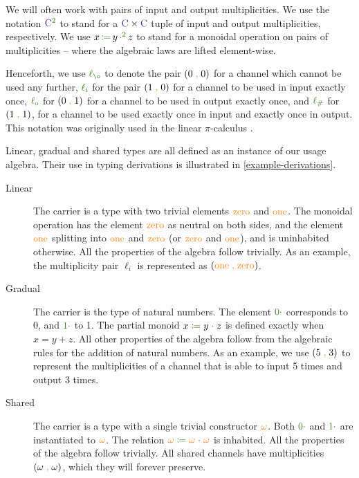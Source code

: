 \documentclass[a4paper,UKenglish,cleveref,autoref,thm-restate,authorcolumns]{lipics-v2019}
\theoremstyle{definition}
\newcommand{\picalc}{$\pi$-calculus}
\newcommand{\type}[1]{\textcolor{BlueViolet}{\operatorname{#1}}}
\newcommand{\constr}[1]{\textcolor{BurntOrange}{\operatorname{#1}}}
\newcommand{\func}[1]{\textcolor{OliveGreen}{\operatorname{#1}}}
\newcommand{\comma}{\; \constr{,} \;}
\newcommand{\op}[3]{#1 \; \func{\coloneqq} \; #2 \; \func{\cdot} \; #3}
\newcommand{\opsquared}[3]{#1 \, \func{\coloneqq} \, #2 \, \func{\cdot^2} \, #3}
\newcommand{\zero}{\func{0\cdot}}
\newcommand{\one}{\func{1\cdot}}
\newcommand{\li}{\func{\ell_i}}
\newcommand{\lo}{\func{\ell_o}}
\newcommand{\lz}{\func{\ell_{\o}}}
\newcommand{\lio}{\func{\ell_{\#}}}
\begin{document}
\begin{note}
  \label{note:linearity}
  We will often work with pairs of input and output multiplicities.
  We use the notation $\type{C}^{\func{2}}$ to stand for a $\type{C} \times \type{C}$ tuple of input and output multiplicities, respectively.
  We use $\opsquared{x}{y}{z}$ to stand for a monoidal operation on pairs of multiplicities -- where the algebraic laws are lifted element-wise.

  Henceforth, we use $\lz$ to denote the pair $(0 \comma 0)$ for a channel which cannot be used any further, $\li$ for the pair $(1 \comma 0)$ for a channel to be used in input exactly once, $\lo$ for $(0 \comma 1)$ for a channel to be used in output exactly once, and $\lio$ for $(1 \comma 1)$, for a channel to be used exactly once in input and exactly once in output.
  This notation was originally used in the linear \picalc{} \cite{KPT96,Sangio01}.
\end{note}

Linear, gradual and shared types are all defined as an instance of our usage algebra.
Their use in typing derivations is illustrated in \autoref{example-derivations}.
\begin{description}
  \item [Linear]
    The carrier is a type with two trivial elements $\constr{zero}$ and $\constr{one}$.
    The monoidal operation has the element $\constr{zero}$ as neutral on both sides, and the element $\constr{one}$ splitting into $\constr{one}$ and $\constr{zero}$ (or $\constr{zero}$ and $\constr{one}$), and is uninhabited otherwise.
    All the properties of the algebra follow trivially.
    As an example, the multiplicity pair $\ell_i$ is represented as $(\constr{one} \comma \constr{zero})$.

    \item [Gradual]
    The carrier is the type of natural numbers.
    The element $\zero$ corresponds to 0, and $\one$ to 1.
    The partial monoid $\op{x}{y}{z}$ is defined exactly when $x = y + z$.
    All other properties of the algebra follow from the algebraic rules for the addition of natural numbers.
    As an example, we use $(5 \comma 3)$ to represent the multiplicities of a channel that is able to input 5 times and output 3 times.

    \item [Shared]
    The carrier is a type with a single trivial constructor $\constr{\omega}$.
    Both $\zero$ and $\one$ are instantiated to $\constr{\omega}$.
    The relation $\op{\constr{\omega}}{\constr{\omega}}{\constr{\omega}}$ is inhabited.
    All the properties of the algebra follow trivially.
    All shared channels have multiplicities $(\omega \comma \omega)$, which they will forever preserve.
\end{description}
\end{document}
